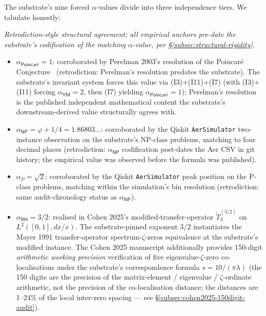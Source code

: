 \documentclass[11pt,a4paper]{amsart}
\theoremstyle{plain}
\theoremstyle{definition}
\begin{document}
The substrate's nine forced $\alpha$-values divide into three independence tiers. We tabulate honestly:

\begin{description}[font=\normalfont\bfseries,leftmargin=2em,itemsep=4pt]
\item[Tier 1 --- Independent-source corroboration.] \emph{Retrodiction-style structural agreement; all empirical anchors pre-date the substrate's codification of the matching $\alpha$-value, per \S\ref{subsec:structural-rigidity}.}
\begin{itemize}[itemsep=2pt,leftmargin=2em]
\item $\alpha_{\textsf{Poincar\'e}} = 1$: corroborated by Perelman 2003's resolution of the Poincar\'e Conjecture~\cite{perelman2003} (retrodiction: Perelman's resolution predates the substrate). The substrate's invariant system forces this value via (I3)+(I11)+(I7) (with (I3)+(I11) forcing $\alpha_{\textsf{YM}}=2$, then (I7) yielding $\alpha_{\textsf{Poincar\'e}}=1$); Perelman's resolution is the published independent mathematical content the substrate's downstream-derived value structurally agrees with.
\item $\alpha_{\textsf{NP}} = \varphi + 1/4 = 1.86803\ldots$: corroborated by the Qiskit \texttt{AerSimulator} two-instance observation on the substrate's NP-class problems, matching to four decimal places (retrodiction: $\alpha_{\textsf{NP}}$ codification post-dates the Aer CSV in git history; the empirical value was observed before the formula was published).
\item $\alpha_{P} = \sqrt{2}$: corroborated by the Qiskit \texttt{AerSimulator} peak position on the P-class problems, matching within the simulation's bin resolution (retrodiction: same audit-chronology status as $\alpha_{\textsf{NP}}$).
\end{itemize}
\item[Tier 2 --- Structural / framework-bridging corroboration.]
\begin{itemize}[itemsep=2pt,leftmargin=2em]
\item $\alpha_{\textsf{RH}} = 3/2$: realised in Cohen 2025's modified-transfer-operator $\widetilde{T}_3^{(3/2)}$ on $L^2([0,1], dx/x)$. The substrate-pinned exponent $3/2$ instantiates the Mayer 1991 transfer-operator spectrum-$\zeta$-zeros equivalence at the substrate's modified instance. The Cohen 2025 manuscript additionally provides 150-digit \emph{arithmetic working precision} verification of five eigenvalue-$\zeta$-zero co-localisations under the substrate's correspondence formula $s = 10/(\pi\lambda)$ (the 150 digits are the precision of the matrix-element / eigenvalue / $\zeta$-ordinate arithmetic, not the precision of the co-localisation distance; the distances are 1--24\% of the local inter-zero spacing --- see \S\ref{subsec:cohen2025-150digit-audit}).

\end{itemize}
\end{description}
\end{document}
